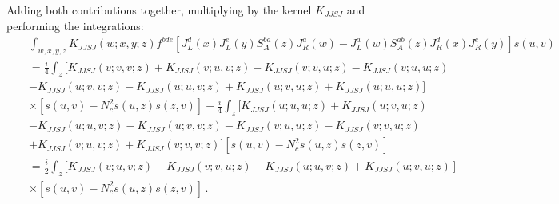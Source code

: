 \documentclass[11pt,a4paper]{article}
\begin{document}
Adding both contributions together, multiplying by the kernel $K_{JJSJ}$  and performing the integrations:
  \begin{eqnarray}
&&\int_{w,x,y,z}K_{JJSJ}(w;x,y;z)f^{bde}\left[J_{L}^{d}(x)J_{L}^{e}(y)S_A^{ba}(z)J_{R}^{a}(w)-J_{L}^{a}(w)S_A^{ab}(z)J_{R}^{d}(x)J_{R}^{e}(y)\right]s(u,v)\nonumber \\
&&=\frac{i}{4}\int_{z}\Big[K_{JJSJ}(v;v,v;z)+K_{JJSJ}(v;u,v;z)-K_{JJSJ}(v;v,u;z)-K_{JJSJ}(v;u,u;z)\nonumber\\
&&-K_{JJSJ}(u;v,v;z)-K_{JJSJ}(u;u,v;z)+K_{JJSJ}(u;v,u;z)+K_{JJSJ}(u;u,u;z)\Big ]\nonumber\\
&&\times \left[s(u,v)-N_{c}^{2}s(u,z)s(z,v)\right]+\frac{i}{4}\int_{z} [K_{JJSJ}(u;u,u;z)+K_{JJSJ}(u;v,u;z)\nonumber \\ 
&&-K_{JJSJ}(u;u,v;z)-K_{JJSJ}(u;v,v;z)-K_{JJSJ}(v;u,u;z)-K_{JJSJ}(v;v,u;z)\nonumber\\
&&+K_{JJSJ}(v;u,v;z)+K_{JJSJ}(v;v,v;z)]\left[s(u,v)-N_{c}^{2}s(u,z)s(z,v)\right]\nonumber\\
&&=\frac{i}{2}\int_{z}\left.[
K_{JJSJ}(v;u,v;z)-K_{JJSJ}(v;v,u;z)
-K_{JJSJ}(u;u,v;z)+K_{JJSJ}(u;v,u;z)
\right]\nonumber \\
&&\times \left[s(u,v)-N_{c}^{2}s(u,z)s(z,v)\right]\label{rJJSJ}\,.
 \end{eqnarray}
\end{document}
